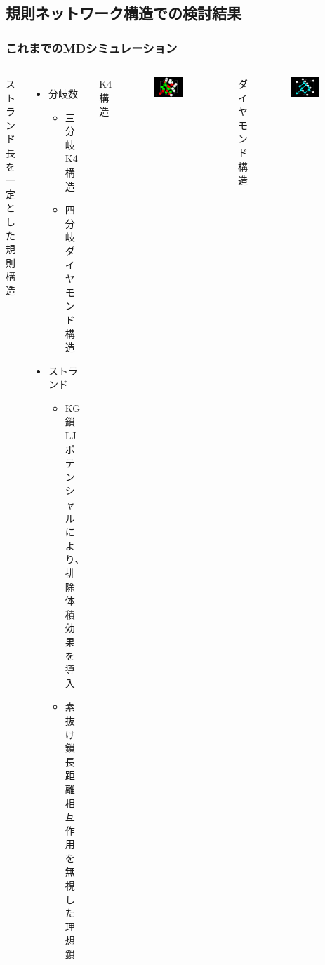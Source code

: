 \documentclass[11pt, dvipdfmx]{beamer}
\begin{document}
\subsection{規則ネットワーク構造での検討結果}
\begin{frame}
\frametitle{これまでのMDシミュレーション}
\begin{columns}[totalwidth=1\textwidth]
ストランド長を一定とした\\規則構造
\begin{itemize}
 \item 
 分岐数 
 	\begin{itemize}
 	\item  
 	三分岐\\
 	K4 構造
 	\item
 	四分岐\\
 	ダイヤモンド構造
	\end{itemize}
 \item 
 ストランド
 	\begin{itemize}
 	\item  
 	KG鎖\\
 	LJ ポテンシャルにより、排除体積効果を導入
 	\item
	素抜け鎖\\
	長距離相互作用を無視した理想鎖
	\end{itemize}
\end{itemize}
K4 構造
\vspace{-3mm}
\begin{figure}
\centering
\includegraphics[width=0.7\textwidth]{./fig/K4_d.png}
\end{figure}
ダイヤモンド構造
\vspace{-3mm}
\begin{figure}
\centering
\includegraphics[width=0.7\textwidth]{./fig/dia.png}
\end{figure}
\end{columns}
\end{frame}
\end{document}
